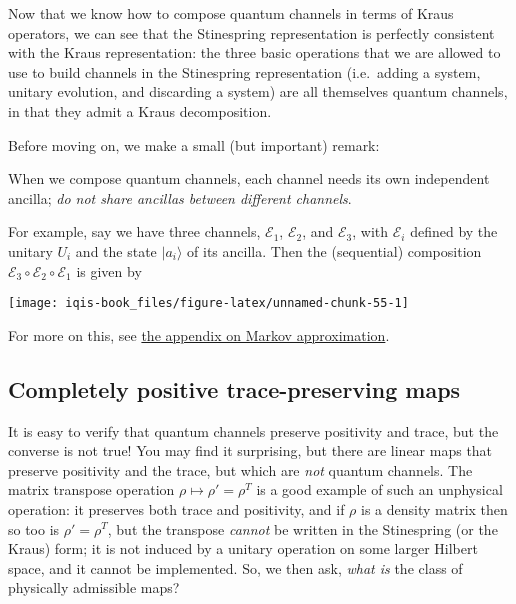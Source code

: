 \documentclass[fleqn]{article}
\newenvironment{idea}{\noindent}{\medskip}
\begin{document}
Now that we know how to compose quantum channels in terms of Kraus operators, we can see that the Stinespring representation is perfectly consistent with the Kraus representation: the three basic operations that we are allowed to use to build channels in the Stinespring representation (i.e.~adding a system, unitary evolution, and discarding a system) are all themselves quantum channels, in that they admit a Kraus decomposition.

Before moving on, we make a small (but important) remark:

\begin{idea}
When we compose quantum channels, each channel needs its own independent ancilla;
\emph{do not share ancillas between different channels}.

\end{idea}

For example, say we have three channels, \(\mathcal{E}_1\), \(\mathcal{E}_2\), and \(\mathcal{E}_3\), with \(\mathcal{E}_i\) defined by the unitary \(U_i\) and the state \(|a_i\rangle\) of its ancilla.
Then the (sequential) composition \(\mathcal{E}_3\circ\mathcal{E}_2\circ\mathcal{E}_1\) is given by

\begin{center}\texttt{[image: iqis-book\_files/figure-latex/unnamed-chunk-55-1]} \end{center}

For more on this, see \protect\hyperlink{markov-approximation}{the appendix on Markov approximation}.

\hypertarget{completely-positive-trace-preserving-maps}{%
\subsection{Completely positive trace-preserving maps}\label{completely-positive-trace-preserving-maps}}

It is easy to verify that quantum channels preserve positivity and trace, but the converse is not true!
You may find it surprising, but there are linear maps that preserve positivity and the trace, but which are \emph{not} quantum channels.
The matrix transpose operation \(\rho\mapsto\rho'=\rho^T\) is a good example of such an unphysical operation: it preserves both trace and positivity, and if \(\rho\) is a density matrix then so too is \(\rho'=\rho^T\), but the transpose \emph{cannot} be written in the Stinespring (or the Kraus) form;
it is not induced by a unitary operation on some larger Hilbert space, and it cannot be implemented.
So, we then ask, \emph{what is} the class of physically admissible maps?
\end{document}
